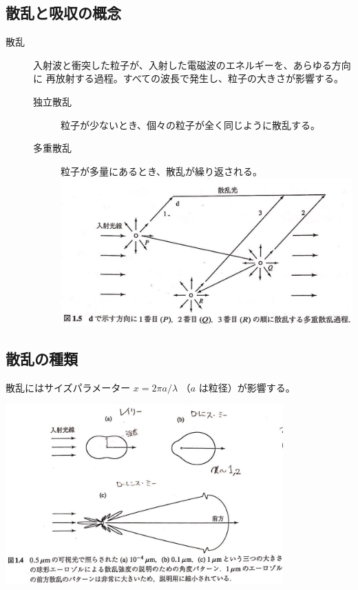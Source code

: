 \documentclass[article]{dennou777}
\newcommand{\centeralign}[1]{\rule{0pt}{0pt}\hfill#1\hfill\rule{0pt}{0pt}}
\begin{document}
\subsection{散乱と吸収の概念}
\begin{description}
	\item[散乱] 入射波と衝突した粒子が、入射した電磁波のエネルギーを、あらゆる方向に
		再放射する過程。すべての波長で発生し、粒子の大きさが影響する。
		\begin{description}
			\item[独立散乱] 粒子が少ないとき、個々の粒子が全く同じように散乱する。
			\item[多重散乱] 粒子が多量にあるとき、散乱が繰り返される。\\
				\includegraphics[width=\linewidth]{mscatter.jpg}
		\end{description}
\end{description}

\subsection{散乱の種類}
散乱にはサイズパラメーター $x=2\pi a/\lambda$ （$a$ は粒径）が影響する。

\centeralign{\includegraphics[width=0.8\textwidth]{scatter.jpg}}
\end{document}

